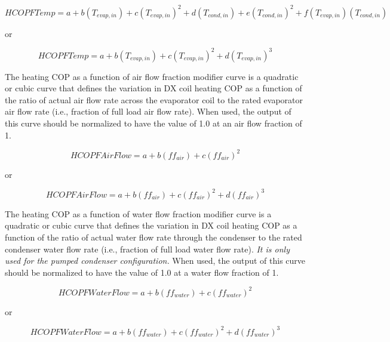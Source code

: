 \begin{equation}
HCOPFTemp = a + b\left( {{T_{evap,in}}} \right) + c{\left( {{T_{evap,in}}} \right)^2} + d\left( {{T_{cond,in}}} \right) + e{\left( {{T_{cond,in}}} \right)^2} + f\left( {{T_{evap,in}}} \right)\left( {{T_{cond,in}}} \right)
\end{equation}

or

\begin{equation}
HCOPFTemp = a + b\left( {{T_{evap,in}}} \right) + c{\left( {{T_{evap,in}}} \right)^2} + d{\left( {{T_{evap,in}}} \right)^3}
\end{equation}

The heating COP as a function of air flow fraction modifier curve is a quadratic or cubic curve that defines the variation in DX coil heating COP as a function of the ratio of actual air flow rate across the evaporator coil to the rated evaporator air flow rate (i.e., fraction of full load air flow rate). When used, the output of this curve should be normalized to have the value of 1.0 at an air flow fraction of 1.

\begin{equation}
HCOPFAirFlow = a + b\left( {f{f_{air}}} \right) + c{\left( {f{f_{air}}} \right)^2}
\end{equation}

or

\begin{equation}
HCOPFAirFlow = a + b\left( {f{f_{air}}} \right) + c{\left( {f{f_{air}}} \right)^2} + d{\left( {f{f_{air}}} \right)^3}
\end{equation}

The heating COP as a function of water flow fraction modifier curve is a quadratic or cubic curve that defines the variation in DX coil heating COP as a function of the ratio of actual water flow rate through the condenser to the rated condenser water flow rate (i.e., fraction of full load water flow rate). \emph{It is only used for the pumped condenser configuration.} When used, the output of this curve should be normalized to have the value of 1.0 at a water flow fraction of 1.

\begin{equation}
HCOPFWaterFlow = a + b\left( {f{f_{water}}} \right) + c{\left( {f{f_{water}}} \right)^2}
\end{equation}

or

\begin{equation}
HCOPFWaterFlow = a + b\left( {f{f_{water}}} \right) + c{\left( {f{f_{water}}} \right)^2} + d{\left( {f{f_{water}}} \right)^3}
\end{equation}

